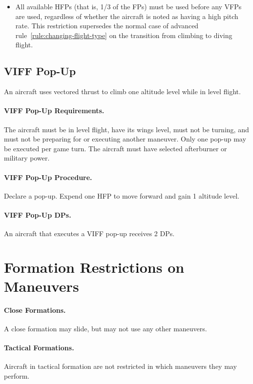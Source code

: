 \begin{advancedrules}
{\begin{itemize}

    \item All available HFPs (that is, 1/3 of the FPs) must be used before any VFPs are used, regardless of whether the aircraft is noted as having a high pitch rate. This restriction supersedes the normal case of advanced rule~\ref{rule:changing-flight-type} on the transition from climbing to diving flight.
    
\end{itemize}

\subsection{VIFF Pop-Up}

An aircraft uses vectored thrust to climb one altitude level while in level flight.

\paragraph{VIFF Pop-Up Requirements.} The aircraft must be in level flight, have its wings level, must not be turning, and must not be preparing for or executing another maneuver. Only one pop-up may be executed per game turn. The aircraft must have selected afterburner or military power.

\paragraph{VIFF Pop-Up Procedure.} Declare a pop-up. Expend one HFP to move forward and gain 1 altitude level.

\paragraph{VIFF Pop-Up DPs.} An aircraft that executes a VIFF pop-up receives 2 DPs.

}

\section{Formation Restrictions on Maneuvers}

\paragraph{Close Formations.} A close formation may slide, but may not use any other maneuvers.

\paragraph{Tactical Formations.} Aircraft in tactical formation are not restricted in which maneuvers they may perform.

\end{advancedrules}
